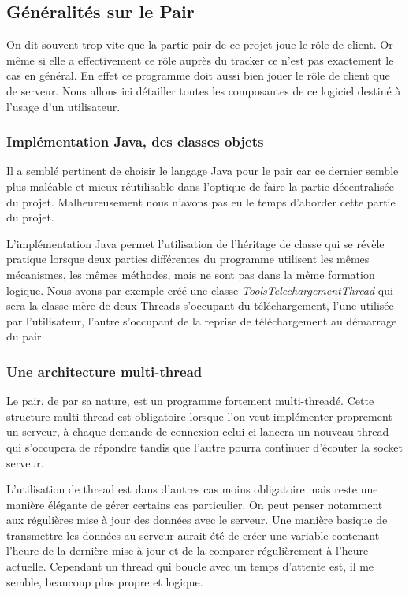 


\subsection{Généralités sur le Pair}
On dit souvent trop vite que la partie pair de ce projet joue le rôle
de client. Or même si elle a effectivement ce rôle auprès du tracker
ce n'est pas exactement le cas en général. En effet ce programme doit
aussi bien jouer le rôle de client que de serveur. Nous allons ici
détailler toutes les composantes de ce logiciel destiné à l'usage d'un
utilisateur.

\subsubsection{Implémentation Java, des classes objets}
Il a semblé pertinent de choisir le langage Java pour le pair car ce
dernier semble plus maléable et mieux réutilisable dans l'optique de
faire la partie décentralisée du projet. Malheureusement nous n'avons
pas eu le temps d'aborder cette partie du projet.

L'implémentation Java permet l'utilisation de l'héritage de classe qui
se révèle pratique lorsque deux parties différentes du programme
utilisent les mêmes mécanismes, les mêmes méthodes, mais ne sont pas
dans la même formation logique. Nous avons par exemple créé une classe
\textit{ToolsTelechargementThread} qui sera la classe mère de deux
Threads s'occupant du téléchargement, l'une utilisée par l'utilisateur,
l'autre s'occupant de la reprise de téléchargement au démarrage du
pair.

\subsubsection{Une architecture multi-thread}
Le pair, de par sa nature, est un programme fortement
multi-threadé. Cette structure multi-thread est obligatoire lorsque
l'on veut implémenter proprement un serveur, à chaque demande de
connexion celui-ci lancera un nouveau thread qui s'occupera de
répondre tandis que l'autre pourra continuer d'écouter la socket
serveur.

L'utilisation de thread est dans d'autres cas moins obligatoire mais
reste une manière élégante de gérer certains cas particulier. On peut
penser notamment aux régulières mise à jour des données avec le
serveur. Une manière basique de transmettre les données au serveur
aurait été de créer une variable contenant l'heure de la dernière
mise-à-jour et de la comparer régulièrement à l'heure
actuelle. Cependant un thread qui boucle avec un temps d'attente est,
il me semble, beaucoup plus propre et logique.

